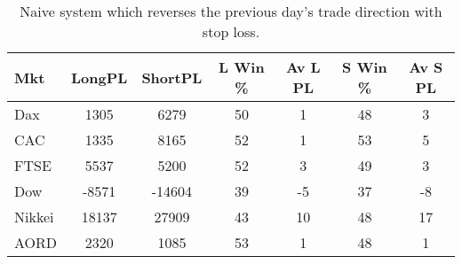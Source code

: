 \begin{table}[ht]
\centering
\caption[Naive Following System.]{Naive system which reverses the previous day's trade direction with stop loss.} 
\label{tab:ntfresults_sl}
\begin{tabular}{lcccccc}
  \toprule Mkt & LongPL & ShortPL & L Win \% & Av L PL & S Win \% & Av S PL \\ 
  \midrule Dax & 1305 & 6279 & 50 & 1 & 48 & 3 \\ 
  CAC & 1335 & 8165 & 52 & 1 & 53 & 5 \\ 
  FTSE & 5537 & 5200 & 52 & 3 & 49 & 3 \\ 
  Dow & -8571 & -14604 & 39 & -5 & 37 & -8 \\ 
  Nikkei & 18137 & 27909 & 43 & 10 & 48 & 17 \\ 
  AORD & 2320 & 1085 & 53 & 1 & 48 & 1 \\ 
   \bottomrule \end{tabular}
\end{table}
